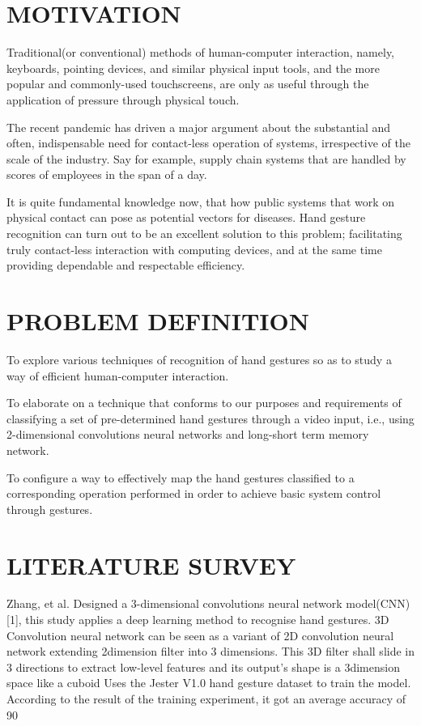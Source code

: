 \documentclass[oneside,a4paper,12pt]{report}
\begin{document}
    \chapter{MOTIVATION}
        Traditional(or conventional) methods of human-computer interaction, namely, keyboards, pointing devices, and similar physical input tools, and the more popular and commonly-used touchscreens, are only as useful through the application of pressure through physical touch.


        The recent pandemic has driven a major argument about the substantial and often, indispensable need for contact-less operation of systems, irrespective of the scale of the industry. Say for example, supply chain systems that are handled by scores of employees in the span of a day. 


        It is quite fundamental knowledge now, that how public systems that work on physical contact can pose as potential vectors for diseases. Hand gesture recognition can turn out to be an excellent solution to this problem; facilitating truly contact-less interaction with computing devices, and at the same time providing dependable and respectable efficiency.


\chapter{PROBLEM DEFINITION}
    To explore various techniques of recognition of hand gestures so as to study a way of efficient human-computer interaction.


    To elaborate on a technique that conforms to our purposes and requirements of classifying a set of pre-determined hand gestures through a video input, i.e., using 2-dimensional convolutions neural networks and long-short term memory network.
    
    
    To configure a way to effectively map the hand gestures classified to a corresponding operation performed in order to achieve basic system control through gestures.




\chapter{LITERATURE SURVEY}
    Zhang, et al. Designed a 3-dimensional convolutions neural network model(CNN) [1], this study applies a deep learning method to recognise hand gestures. 3D Convolution neural network can be seen as a variant of 2D convolution  neural network extending 2dimension filter into 3 dimensions. This 3D filter shall slide in 3 directions to extract low-level features and its output’s shape is a 3dimension space like a cuboid Uses the Jester V1.0 hand gesture dataset to train the model. According to the result of the training experiment, it got an average accuracy of 90%
    
\end{document}
